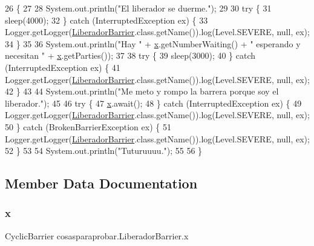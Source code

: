 \begin{DoxyCode}
26                      \{
27         
28             System.out.println(\textcolor{stringliteral}{"El liberador se duerme."});
29             
30         \textcolor{keywordflow}{try} \{
31             sleep(4000);
32         \} \textcolor{keywordflow}{catch} (InterruptedException ex) \{
33             Logger.getLogger(\mbox{\hyperlink{classcosasparaprobar_1_1_liberador_barrier_a1dc02539d347dd8def3f305ce1740ec0}{LiberadorBarrier}}.class.getName()).log(Level.SEVERE, null, ex);
34         \}
35         
36             System.out.println(\textcolor{stringliteral}{"Hay "} + \mbox{\hyperlink{classcosasparaprobar_1_1_liberador_barrier_aa6e62e53154e857e0aa8023d87cc42c4}{x}}.getNumberWaiting() + \textcolor{stringliteral}{" esperando y necesitan "} + 
      \mbox{\hyperlink{classcosasparaprobar_1_1_liberador_barrier_aa6e62e53154e857e0aa8023d87cc42c4}{x}}.getParties());
37             
38             \textcolor{keywordflow}{try} \{
39                 sleep(3000);
40             \} \textcolor{keywordflow}{catch} (InterruptedException ex) \{
41                 Logger.getLogger(\mbox{\hyperlink{classcosasparaprobar_1_1_liberador_barrier_a1dc02539d347dd8def3f305ce1740ec0}{LiberadorBarrier}}.class.getName()).log(Level.SEVERE, null, 
      ex);
42             \}
43             
44             System.out.println(\textcolor{stringliteral}{"Me meto y rompo la barrera porque soy el liberador."});
45             
46         \textcolor{keywordflow}{try} \{
47             \mbox{\hyperlink{classcosasparaprobar_1_1_liberador_barrier_aa6e62e53154e857e0aa8023d87cc42c4}{x}}.await();
48         \} \textcolor{keywordflow}{catch} (InterruptedException ex) \{
49             Logger.getLogger(\mbox{\hyperlink{classcosasparaprobar_1_1_liberador_barrier_a1dc02539d347dd8def3f305ce1740ec0}{LiberadorBarrier}}.class.getName()).log(Level.SEVERE, null, ex);
50         \} \textcolor{keywordflow}{catch} (BrokenBarrierException ex) \{
51             Logger.getLogger(\mbox{\hyperlink{classcosasparaprobar_1_1_liberador_barrier_a1dc02539d347dd8def3f305ce1740ec0}{LiberadorBarrier}}.class.getName()).log(Level.SEVERE, null, ex);
52         \}
53             
54         System.out.println(\textcolor{stringliteral}{"Tuturuuuu."});
55         
56     \}
\end{DoxyCode}


\subsection{Member Data Documentation}
\mbox{\label{classcosasparaprobar_1_1_liberador_barrier_aa6e62e53154e857e0aa8023d87cc42c4}} 
\subsubsection{\texorpdfstring{x}{x}}
{\footnotesize\ttfamily Cyclic\+Barrier cosasparaprobar.\+Liberador\+Barrier.\+x\hspace{0.3cm}{\ttfamily [package]}}


